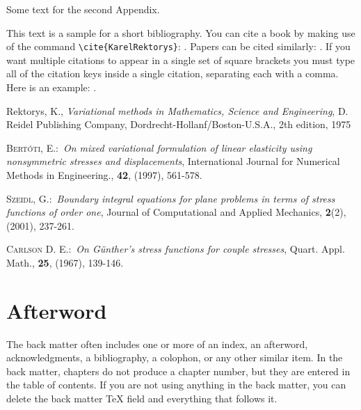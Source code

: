 \documentclass[letterpaper,12pt,openany,reqno]{book}%
\begin{document}
Some text for the second Appendix.

This text is a sample for a short bibliography. You can cite a book by making use of
the command \verb"\cite{KarelRektorys}": \cite{KarelRektorys}. Papers can be cited
similarly: \cite{Bertoti97}. If you want multiple citations to appear in a single set
of square brackets you must type all of the citation keys inside a single citation,
separating each with a comma. Here is an example: \cite{Bertoti97, Szeidl2001,
Carlson67}.

\begin{thebibliography}{9}
Rektorys, K., \textit{Variational methods in Mathematics,
Science and Engineering}, D. Reidel Publishing Company,
Dordrecht-Hollanf/Boston-U.S.A., 2th edition, 1975

 \textsc{Bert\'{o}ti, E.}:\ \textit{On mixed variational formulation
of linear elasticity using nonsymmetric stresses and displacements}, International
Journal for Numerical Methods in Engineering., \textbf{42}, (1997), 561-578.

 \textsc{Szeidl, G.}:\ \textit{Boundary integral equations for
plane problems in terms of stress functions of order one}, Journal of Computational and
Applied Mechanics, \textbf{2}(2), (2001), 237-261.

  \textsc{Carlson D. E.}:\ \textit{On G\"{u}nther's stress functions
for couple stresses}, Quart. Appl. Math., \textbf{25}, (1967), 139-146.
\end{thebibliography}

\backmatter

\chapter{Afterword}

The back matter often includes one or more of an index, an afterword,
acknowledgments, a bibliography, a colophon, or any other similar item. In
the back matter, chapters do not produce a chapter number, but they are
entered in the table of contents. If you are not using anything in the back
matter, you can delete the back matter TeX field and everything that follows it.
\end{document}
